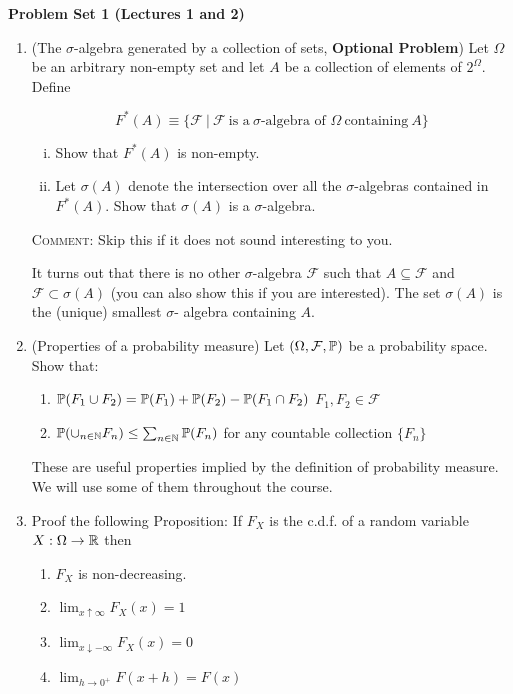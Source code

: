 \documentclass[11pt]{article} %
\begin{document}
\onehalfspace

\textbf{Problem Set 1 (Lectures 1 and 2)}

\begin{enumerate}
\item (The $\sigma$-algebra generated by a collection of sets, \textbf{Optional Problem}) Let $\Omega$ be an arbitrary non-empty set and let $A$ be a collection of elements of $2^\Omega$.  Define 

$$F^*(A) \equiv \{\mathcal{F} \: | \: \mathcal{F} \: \text{is a} \: \sigma\text{-algebra of } \Omega \: \text{containing} \: A\} $$

\begin{enumerate}[i)]
\item Show that $F^*(A)$ is non-empty. 
\item Let $\sigma(A)$ denote the intersection over all the $\sigma$-algebras contained in $F^*(A)$. Show that $\sigma(A)$ is a $\sigma$-algebra.
\end{enumerate}

{\scshape Comment:} Skip this if it does not sound interesting to you. 

 It turns out that there is no other $\sigma$-algebra  $\mathcal{F}$ such that $A \subseteq \mathcal{F}$ and $\mathcal{F} \subset \sigma(A)$ (you can also show this if you are interested). The set $\sigma(A)$ is the (unique) smallest $\sigma$- algebra containing $A$.\\


\item (Properties of a probability measure) Let $(\Omega, \mathcal{F}, \mathbb{P})$ be a probability space. Show that:
\begin{enumerate}
\item $\mathbb{P}(F_1 \cup F_2) = \mathbb{P}(F_1) + \mathbb{P}(F_2) - \mathbb{P}(F_1 \cap F_2)$  $F_1,F_2 \in \mathcal{F}$
\item $\mathbb{P}(\cup_{n \in \mathbb{N}} F_n) \leq \sum_{n \in \mathbb{N}} \mathbb{P}(F_n) $ for any countable collection $\{F_n\}$
\end{enumerate}

 These are useful properties implied by the definition of probability measure. We will use some of them throughout the course. 

\item Proof the following Proposition: If $F_{X}$ is the c.d.f. of a random variable $X: \Omega \rightarrow \mathbb{R}$ then 
\begin{enumerate}
\item $F_{X}$ is non-decreasing.
\item $\lim_{x \uparrow \infty} F_{X}(x)=1$
\item $\lim_{x \downarrow -\infty} F_{X}(x)=0$
\item $\lim_{h \rightarrow 0^{+}} F(x+h)=F(x)$
\end{enumerate}


\end{enumerate}
\end{document}
